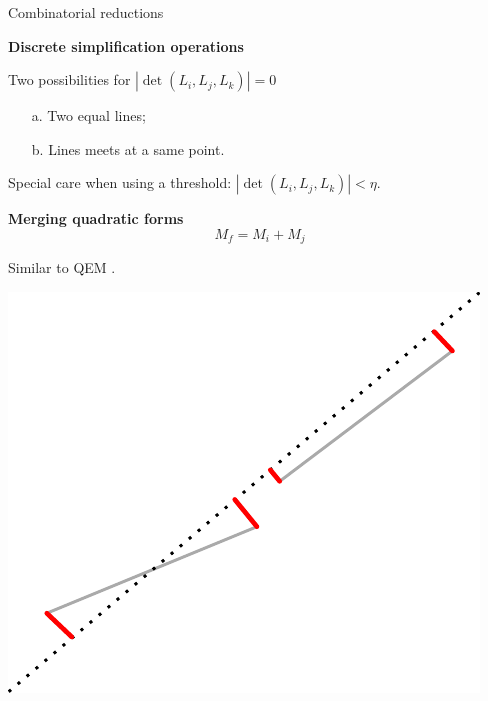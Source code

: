 \begin{frame}{Combinatorial reductions}
	\scriptsize

	\textbf{Discrete simplification operations}
		
	Two possibilities for $|\det(L_i, L_j, L_k) | = 0$
	\begin{enumerate}
		\item[a.] Two equal lines;
		\item[b.] Lines meets at a same point.
	\end{enumerate}
	
	Special care when using a threshold: $|\det(L_i, L_j, L_k) | < \eta$.
	\pause
	
	\vspace{0.5cm}
	
	\begin{minipage}{0.7\linewidth}
	
	\textbf{Merging quadratic forms}
	\[ M_f = M_i + M_j \]
	
	Similar to QEM \cite{garland_SurfaceSimplificationUsing_1997}.
	\end{minipage}%
	\begin{minipage}{0.3\linewidth}
		\centering
		\includegraphics[height=0.8\linewidth]{metric_merge}
	\end{minipage}
\end{frame}


